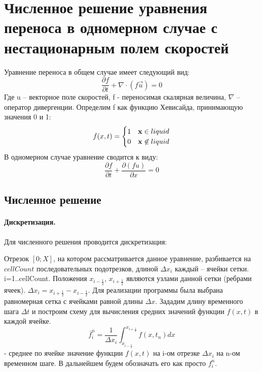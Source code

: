 \documentclass[12pt,a4paper]{article}
\begin{document}
\section{Численное решение уравнения переноса в одномерном случае с нестационарным полем скоростей}
Уравнение переноса в общем случае имеет следующий вид:
\begin{equation}
\label{eqn:TE}
\frac{\partial f}{\partial t}+\nabla\cdot(f\overrightarrow{u})=0
\end{equation}
Где u – векторное поле скоростей, f - переносимая скалярная величина, $ \nabla $ – оператор дивергенции. Определим f как функцию Хевисайда, принимающую значения 0 и 1:
\begin{equation}
f(x,t)=\begin{cases}1 & {\bf x}\in liquid \\0 & {\bf x}\not\in liquid\end{cases}
\end{equation}
В одномерном случае уравнение сводится к виду:
\begin{equation}
\label{eqn:TE1D}
\frac{\partial f}{\partial t} + \frac{\partial (f u)}{\partial x}=0
\end{equation}

\subsection{Численное решение}
\label{sec:TESolutionUnonstat}
\paragraph{Дискретизация.}
Для численного решения проводится дискретизация:

Отрезок $[0;X]$, на котором рассматривается данное уравнение, разбивается на $cellCount$ последовательных подотрезков, длиной $\Delta x_i$ каждый – ячейки сетки. i=1..cellCount. Положения $x_{i-\frac{1}{2}}$, $x_{i+\frac{1}{2}}$ являются узлами данной сетки (ребрами ячеек). $\Delta x_i=x_{i+\frac{1}{2}}-x_{i-\frac{1}{2}}$. Для реализации программы была выбрана равномерная сетка с ячейками равной длины $\Delta x$. Зададим длину временного шага $\Delta t$ и построим схему для вычисления средних значений функции $f(x,t)$ в каждой ячейке.
\begin{equation}
\overline{f}_i^n=\frac{1}{\Delta x_i}\int_{x_{i-\frac{1}{2}}}^{x_{i+\frac{1}{2}}}f(x,t_n)dx 
\end{equation}
- среднее по ячейке значение функции $f(x,t)$ на i-ом отрезке $\Delta x_i$ на n-ом временном шаге. В дальнейшем будем обозначать его как просто $f_i^n$.
\end{document}
